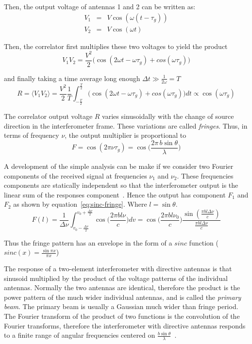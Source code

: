 Then, the output voltage of antennas 1 and 2 can be written as:
\begin{eqnarray}
V_1 &=& V\cos(\omega (t-\tau_g)) \\
V_2 &=& V\cos(\omega t)
\end{eqnarray}

Then, the correlator first multiplies these two voltages to yield the product
\begin{equation}
V_1V_2 = \frac{V^2}{2}\Bigg(\cos(2\omega t - \omega \tau_g) + cos(\omega \tau_g)\Bigg)
\end{equation}
 
and finally taking a time average long enough $\Delta t \gg \frac{1}{2\omega} = T$
\begin{equation}
R = \langle V_1V_2\rangle = \frac{V^2}{2} \frac{1}{T}\int_{-\frac{T}{2}}^{\frac{T}{2}} \big(\cos(2\omega t - \omega \tau_g) + cos(\omega \tau_g)\big) dt
\propto \cos(\omega \tau_g)
\end{equation} 
 
The correlator output voltage $R$ varies sinusoidally with the change of source direction in the interferometer frame. These variations are called \textit{fringes}. Thus, in terms of frequency $\nu$, the output multiplier is proportional to
\begin{equation}
F = \cos(2\pi \nu \tau_g) = \cos\Bigg(\frac{2\pi\, b \sin \theta}{\lambda}\Bigg)
\end{equation}

A development of the simple analysis can be make if we consider two Fourier components of the received signal at frequencies $\nu_1$ and $\nu_2$. These frequencies components are statically independent so that the interferometer output is the linear sum of the responses component~\cite{thompson01}. Hence the output has component $F_1$ and $F_2$ as shown by equation~\ref{eq:sinc-fringe}. Where $l = \sin \theta$.
\begin{equation}
\label{eq:sinc-fringe}
F(l) = \frac{1}{\Delta\nu}\int_{v_0-\frac{\Delta\nu}{2}}^{v_0+\frac{\Delta\nu}{2}}\cos\Bigg(\frac{2\pi b l \nu}{c}\Bigg)dv=
\cos\Bigg(\frac{2\pi b l \nu_0}{c}\Bigg)\frac{\sin(\frac{\pi b l \Delta \nu}{c})}{\frac{\pi b l \Delta \nu}{c}}
\end{equation}
 
Thus the fringe pattern has an envelope in the form of a $sinc$ function ($sinc(x) = \frac{\sin\pi x}{\pi x}$)

The response of a two-element interferometer with directive antennas is that sinusoid multiplied by the product of the voltage patterns of the individual antennas. Normally the two antennas are identical, therefore the product is the power pattern of the much wider individual antennas, and is called the \textit{primary beam}. The primary beam is usually a Gaussian much wider than fringe period. The Fourier transform of the product of two functions is the convolution of the Fourier transforms, therefore the interferometer with directive antennas responds to a finite range of angular frequencies centered on $\frac{b\sin\theta}{\lambda}$~\cite{condon10}.

